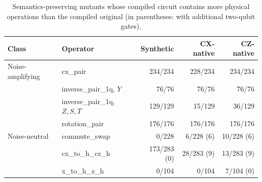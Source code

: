 \begin{table}[t]
\centering
\caption{Semantics-preserving mutants whose compiled circuit contains more physical operations than the compiled original (in parentheses: with additional two-qubit gates).}
\label{tab:rq2-compiled}
\small
\begin{tabular}{llrrr}
\toprule
Class & Operator & Synthetic & CX-native & CZ-native \\
\midrule
Noise-amplifying & cx\_pair & 234/234 & 228/234 & 234/234 \\
 & inverse\_pair\_1q, $Y$ & 76/76 & 76/76 & 76/76 \\
 & inverse\_pair\_1q, $Z, S, T$ & 129/129 & 15/129 & 36/129 \\
 & rotation\_pair & 176/176 & 176/176 & 176/176 \\
Noise-neutral & commute\_swap & 0/228 & 6/228 (6) & 10/228 (6) \\
 & cx\_to\_h\_cz\_h & 173/283 (0) & 28/283 (9) & 13/283 (9) \\
 & x\_to\_h\_z\_h & 0/104 & 0/104 & 7/104 (0) \\
\bottomrule
\end{tabular}
\end{table}
